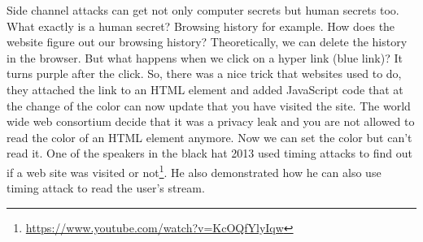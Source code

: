 Side channel attacks can get not only computer secrets but human secrets too.
What exactly is a human secret? Browsing history for example. How does the
website figure out our browsing history? Theoretically, we can delete the
history in the browser. But what happens when we click on a hyper link (blue
link)? It turns purple after the click. So, there was a nice trick that websites
used to do, they attached the link to an HTML element and added JavaScript code
that at the change of the color can now update that you have visited the site.
The world wide web consortium decide that it was a privacy leak and you are not
allowed to read the color of an HTML element anymore. Now we can set the color
but can't read it. One of the speakers in the black hat 2013 used timing attacks
to find out if a web site was visited or
not\footnote{\url{https://www.youtube.com/watch?v=KcOQfYlyIqw}}. He also
demonstrated how he can also use timing attack to read the user's stream. 